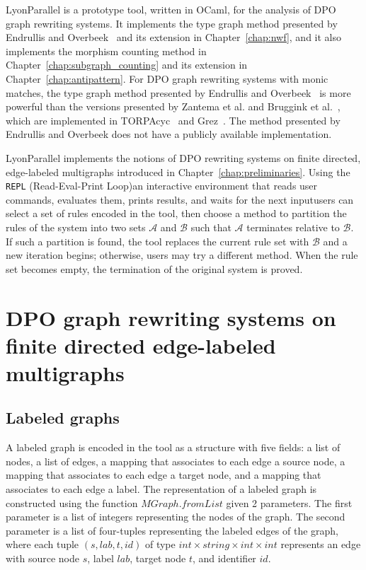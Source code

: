 LyonParallel is a prototype tool, written in OCaml, for the analysis of DPO graph rewriting systems.
It implements the type graph method presented by Endrullis and Overbeek~\cite{endrullis2024generalized_icgt} and its extension in Chapter~\ref{chap:nwf}, and it also implements the morphism counting method in Chapter~\ref{chap:subgraph_counting} and its extension in Chapter~\ref{chap:antipattern}. 
For DPO graph rewriting systems with monic matches,
the type graph method presented by Endrullis and Overbeek~\cite{endrullis2024generalized_icgt} is more powerful than the versions presented by Zantema et al. and Bruggink et al.~\cite{zantema2014termination,bruggink2014termination,bruggink2015proving}, which are implemented in TORPAcyc~\cite{TORPAcyc} and Grez~\cite{grez}. The method presented by Endrullis and Overbeek does not have a publicly available implementation.  

LyonParallel implements the notions of DPO rewriting systems on finite directed, edge-labeled multigraphs introduced in Chapter~\ref{chap:preliminaries}. Using the \texttt{REPL} (Read-Eval-Print Loop)\textemdash{}an interactive environment that reads user commands, evaluates them, prints results, and waits for the next input\textemdash{}users can select a set of rules encoded in the tool, then choose a method to partition the rules of the system into two sets $\mathcal{A}$ and $\mathcal{B}$ such that $\mathcal{A}$ terminates relative to $\mathcal{B}$. If such a partition is found, the tool replaces the current rule set with \(\mathcal{B}\) and a new iteration begins; otherwise, users may try a different method. When the rule set becomes empty, the termination of the original system is proved.
\section{DPO graph rewriting systems on finite directed edge-labeled multigraphs}
\label{lyonparallel:sec:implementation_of_dpo_graph_rewriting_systems}
\subsection{Labeled graphs}
\label{lyonparallel:sec:labeled_graphs}
A labeled graph is encoded in the tool as a structure with five fields: a list of nodes, a list of edges, a mapping that associates to each edge a source node, a mapping that associates to each edge a target node, and a mapping that associates to each edge a label.
The representation of a labeled graph is constructed using the function \colorbox{Ivory2}{$MGraph.fromList$} given 2 parameters. The first parameter is a list of integers representing the nodes of the graph. The second parameter is a list of four-tuples representing the labeled edges of the graph, where each tuple \colorbox{Ivory2}{$(s,lab,t,id)$} of type \colorbox{Ivory2}{$\textit{int}\times \textit{string}\times \textit{int}\times \textit{int}$} represents an edge with source node $s$, label $lab$, target node $t$, and identifier $id$.

